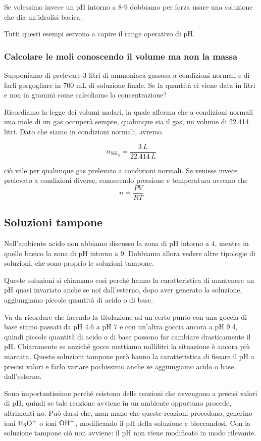 Se volessimo invece un pH intorno a 8-9 dobbiamo per forza usare una soluzione che dia un'idrolisi basica.

Tutti questi esempi servono a capire il range operativo di pH.

\subsubsection{Calcolare le moli conoscendo il volume ma non la massa}
Supponiamo di prelevare 3 litri di ammoniaca gassosa a condizioni normali e di farli gorgogliare in 700 mL di soluzione finale. Se la quantità ci viene data in litri e non in grammi come calcoliamo la concentrazione?

Ricordiamo la legge dei volumi molari, la quale afferma che a condizioni normali una mole di un gas occuperà sempre, qualunque sia il gas, un volume di 22.414 litri. Dato che siamo in condizioni normali, avremo

$$n_{\text{NH}_3}=\frac{3 \, L}{22.414 \, L}$$

ciò vale per qualunque gas prelevato a condizioni normali. Se venisse invece prelevato a condizioni diverse, conoscendo pressione e temperatura avremo che
$$n=\frac{PV}{RT}$$
\subsection{Soluzioni tampone}
Nell'ambiente acido non abbiamo discusso la zona di pH intorno a 4, mentre in quello basico la zona di pH intorno a 9. Dobbiamo allora vedere altre tipologie di soluzioni, che sono proprio le soluzioni tampone.

Queste soluzioni si chiamano così perché hanno la caratteristica di mantenere un pH quasi invariato anche se noi dall'esterno, dopo aver generato la soluzione, aggiungiamo piccole quantità di acido o di base.

Va da ricordare che facendo la titolazione ad un certo punto con una goccia di base siamo passati da pH 4.6 a pH 7 e con un'altra goccia ancora a pH 9.4, quindi piccole quantità di acido o di base possono far cambiare drasticamente il pH. Chiaramente se anziché gocce mettiamo millilitri la situazione è ancora più marcata. Queste soluzioni tampone però hanno la caratteristica di fissare il pH a precisi valori e farlo variare pochissimo anche se aggiungiamo acido o base dall'esterno.

Sono importantissime perché esistono delle reazioni che avvengono a precisi valori di pH, quindi se tale reazione avviene in un ambiente opportuno procede, altrimenti no. Può darsi che, man mano che queste reazioni procedono, generino ioni $\rm H_3O^+$ o ioni $\rm OH^-$, modificando il pH della soluzione e bloccandosi. Con la soluzione tampone ciò non avviene: il pH non viene modificato in modo rilevante.

